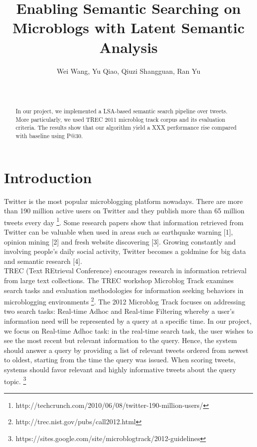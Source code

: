 \documentclass{acm_proc_article-sp}
\begin{document}
\title{Enabling Semantic Searching on Microblogs with Latent Semantic Analysis
}


\author{\alignauthor Wei Wang, Yu Qiao, Qiuzi Shangguan, Ran Yu \\
 \\ 
 \\
} 
\maketitle

\begin{abstract}
In our project, we implemented a LSA-based semantic search pipeline over tweets. More particularly, we used TREC 2011 microblog track corpus and its evaluation criteria. The results show that our algorithm yield a XXX performance rise compared with baseline using P@30. 

\end{abstract}

\section{Introduction}
Twitter is the most popular microblogging platform nowadays. There are more than 190 million active users on Twitter and they publish more than 65 million tweets every day \footnote{http://techcrunch.com/2010/06/08/twitter-190-million-users/}. Some research papers show that information retrieved from Twitter can be valuable when used in areas such as earthquake warning [1], opinion mining [2] and fresh website discovering [3]. Growing constantly and involving people's daily social activity, Twitter becomes a goldmine for big data and semantic research [4].\\
TREC (Text REtrieval Conference) encourages research in information retrieval from large text collections. The TREC workshop Microblog Track examines search tasks and evaluation methodologies for information seeking behaviors in microblogging environments \footnote{http://trec.nist.gov/pubs/call2012.html}. The 2012 Microblog Track focuses on addressing two search tasks: Real-time Adhoc and Real-time Filtering whereby a user's information need will be represented by a query at a specific time. In our project, we focus on Real-time Adhoc task: in the real-time search task, the user wishes to see the most recent but relevant information to the query. Hence, the system should answer a query by providing a list of relevant tweets ordered from newest to oldest, starting from the time the query was issued. When scoring tweets, systems should favor relevant and highly informative tweets about the query topic. \footnote{https://sites.google.com/site/microblogtrack/2012-guidelines}
\end{document}

